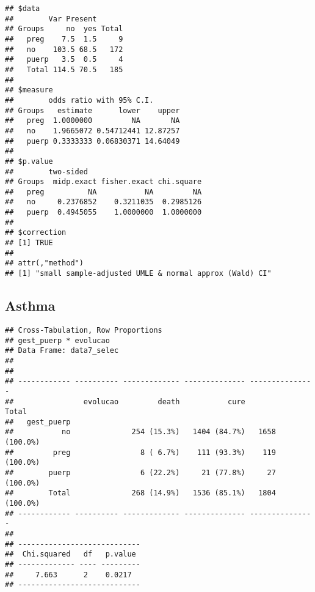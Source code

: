\documentclass[
]{article}
\newenvironment{Shaded}{\begin{snugshade}}{\end{snugshade}}
\newcommand{\DataTypeTok}[1]{\textcolor[rgb]{0.13,0.29,0.53}{#1}}
\newcommand{\KeywordTok}[1]{\textcolor[rgb]{0.13,0.29,0.53}{\textbf{#1}}}
\newcommand{\NormalTok}[1]{#1}
\newcommand{\OperatorTok}[1]{\textcolor[rgb]{0.81,0.36,0.00}{\textbf{#1}}}
\newcommand{\OtherTok}[1]{\textcolor[rgb]{0.56,0.35,0.01}{#1}}
\newcommand{\StringTok}[1]{\textcolor[rgb]{0.31,0.60,0.02}{#1}}
\begin{document}
\begin{verbatim}
## $data
##        Var Present
## Groups     no  yes Total
##   preg    7.5  1.5     9
##   no    103.5 68.5   172
##   puerp   3.5  0.5     4
##   Total 114.5 70.5   185
## 
## $measure
##        odds ratio with 95% C.I.
## Groups   estimate      lower    upper
##   preg  1.0000000         NA       NA
##   no    1.9665072 0.54712441 12.87257
##   puerp 0.3333333 0.06830371 14.64049
## 
## $p.value
##        two-sided
## Groups  midp.exact fisher.exact chi.square
##   preg          NA           NA         NA
##   no     0.2376852    0.3211035  0.2985126
##   puerp  0.4945055    1.0000000  1.0000000
## 
## $correction
## [1] TRUE
## 
## attr(,"method")
## [1] "small sample-adjusted UMLE & normal approx (Wald) CI"
\end{verbatim}

\hypertarget{asthma}{%
\subsection{Asthma}\label{asthma}}

\begin{Shaded}
\end{Shaded}

\begin{Shaded}
\end{Shaded}

\begin{verbatim}
## Cross-Tabulation, Row Proportions  
## gest_puerp * evolucao  
## Data Frame: data7_selec  
## 
## 
## ------------ ---------- ------------- -------------- ---------------
##                evolucao         death           cure           Total
##   gest_puerp                                                        
##           no              254 (15.3%)   1404 (84.7%)   1658 (100.0%)
##         preg                8 ( 6.7%)    111 (93.3%)    119 (100.0%)
##        puerp                6 (22.2%)     21 (77.8%)     27 (100.0%)
##        Total              268 (14.9%)   1536 (85.1%)   1804 (100.0%)
## ------------ ---------- ------------- -------------- ---------------
## 
## ----------------------------
##  Chi.squared   df   p.value 
## ------------- ---- ---------
##     7.663      2    0.0217  
## ----------------------------
\end{verbatim}
\end{document}
